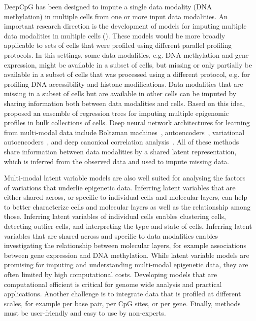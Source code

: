 DeepCpG has been designed to impute a single data modality (DNA methylation) in multiple cells from one or more input data modalities. An important research direction is the development of models for imputing multiple data modalities in multiple cells (). These models would be more broadly applicable to sets of cells that were profiled using different parallel profiling protocols.  In this settings, some data modalities, e.g. DNA methylation and gene expression, might be available in a subset of cells, but missing or only partially be available in a subset of cells that was processed using a different protocol, e.g. for profiling DNA accessibility and histone modifications. Data modalities that are missing in a subset of cells but are available in other cells can be imputed by sharing information both between data modalities and cells. Based on this idea, \citet{ernst_large-scale_2015} proposed an ensemble of regression trees for imputing multiple epigenomic profiles in bulk collections of cells. Deep neural network architectures for learning from multi-modal data include Boltzman machines~\citep{srivastava_multimodal_2012}, autoencoders~\citep{chandar_correlational_2015,rajendran_bridge_2015}, variational autoencoders~\citep{pandey_variational_2016,suzuki_joint_2016,serban_multi-modal_2016}, and deep canonical correlation analysis~\citep{andrew_deep_2013,benton_deep_2017}. All of these methods share information between data modalities by a shared latent representation, which is inferred from the observed data and used to impute missing data.

Multi-modal latent variable models are also well suited for analysing the factors of variations that underlie epigenetic data. Inferring latent variables that are either shared across, or specific to individual cells and molecular layers, can help to better characterize cells and molecular layers as well as the relationship among those. Inferring latent variables of individual cells enables clustering cells, detecting outlier cells, and interpreting the type and state of cells. Inferring latent variables that are shared across and specific to data modalities enables investigating the relationship between molecular layers, for example associations between gene expression and DNA methylation. While latent variable models are promising for imputing and understanding multi-modal epigenetic data, they are often limited by high computational costs. Developing models that are computational efficient is critical for genome wide analysis and practical applications. Another challenge is to integrate data that is profiled at different scales, for example per base pair, per CpG sites, or per gene. Finally, methods must be user-friendly and easy to use by non-experts.
